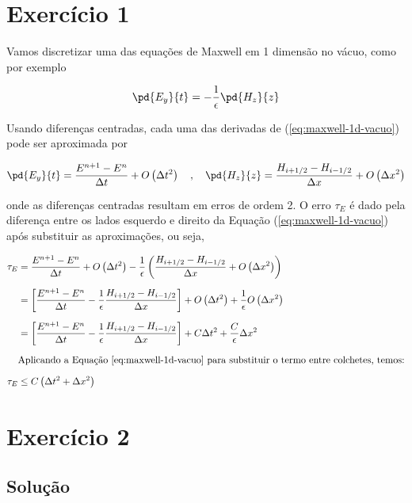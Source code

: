 \chapter{Exercício 1}

Vamos discretizar uma das equações de Maxwell em 1 dimensão no vácuo, 
como por exemplo

\begin{equation}\label{eq:maxwell-1d-vacuo}
	\pd{E_y}{t} =  - \frac{1}{\epsilon} \pd{H_z}{z} 
\end{equation}

Usando diferenças centradas, cada uma das derivadas de (\ref{eq:maxwell-1d-vacuo}) 
pode ser aproximada por 

\[ \pd{E_y}{t} = \frac{E^{n+1} - E^n}{\Delta t} + O\left( \Delta t^2 \right) \quad , \quad 
	\pd{H_z}{z} = \frac{H_{i+1/2} - H_{i-1/2}}{\Delta x} + O\left( \Delta x^2 \right)
\]

\noindent onde as diferenças centradas resultam em erros de ordem 2. O erro $\tau_E$ é dado pela 
diferença entre os lados esquerdo e direito da Equação (\ref{eq:maxwell-1d-vacuo}) após substituir 
as aproximações, ou seja,

\begin{align*}
\tau_E
&=
\frac{E^{n+1} - E^n}{\Delta t} + O\left( \Delta t^2 \right) - \frac{1}{\epsilon} \left( \frac{H_{i+1/2} - H_{i-1/2}}{\Delta x} + O\left( \Delta x^2 \right) \right) 
\\[6pt]
&=
\left[ \frac{E^{n+1} - E^n}{\Delta t} -  \frac{1}{\epsilon} \frac{H_{i+1/2} - H_{i-1/2}}{\Delta x} \right] + O\left( \Delta t^2 \right) + \frac{1}{\epsilon} O\left( \Delta x^2 \right)
\\[6pt]
&=
\left[ \frac{E^{n+1} - E^n}{\Delta t} -  \frac{1}{\epsilon} \frac{H_{i+1/2} - H_{i-1/2}}{\Delta x} \right] + C \Delta t^2  + \frac{C}{\epsilon} \Delta x^2
\\[6pt]
&\text{Aplicando a Equação \ref{eq:maxwell-1d-vacuo} para substituir o termo entre colchetes, temos:}
\\[6pt]
\tau_E
&\leq
C \left( \Delta t^2 + \Delta x^2  \right)
\end{align*}

\chapter{Exercício 2}

\section{Solução}

